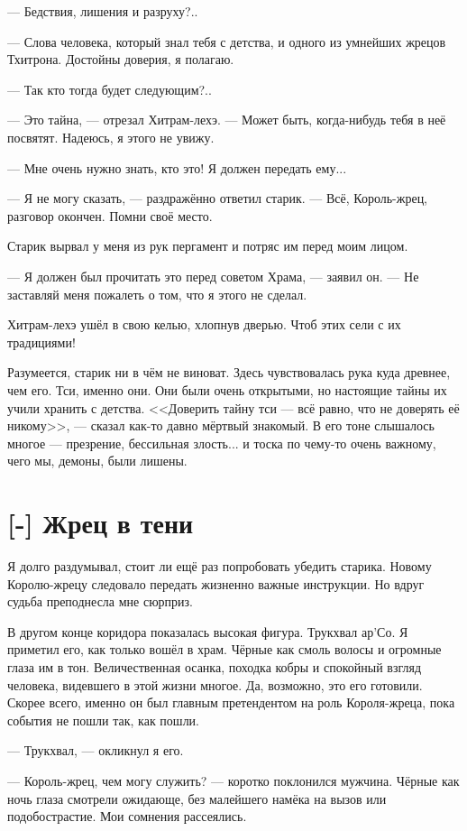 --- Бедствия, лишения и разруху?..

--- Слова человека, который знал тебя с детства, и одного из умнейших жрецов Тхитрона.
Достойны доверия, я полагаю.

--- Так кто тогда будет следующим?..

--- Это тайна, --- отрезал Хитрам-лехэ.
--- Может быть, когда-нибудь тебя в неё посвятят.
Надеюсь, я этого не увижу.

--- Мне очень нужно знать, кто это!
Я должен передать ему...

--- Я не могу сказать, --- раздражённо ответил старик.
--- Всё, Король-жрец, разговор окончен.
Помни своё место.

Старик вырвал у меня из рук пергамент и потряс им перед моим лицом.

--- Я должен был прочитать это перед советом Храма, --- заявил он.
--- Не заставляй меня пожалеть о том, что я этого не сделал.

Хитрам-лехэ ушёл в свою келью, хлопнув дверью.
Чтоб этих сели с их традициями!

Разумеется, старик ни в чём не виноват.
Здесь чувствовалась рука куда древнее, чем его.
Тси, именно они.
Они были очень открытыми, но настоящие тайны их учили хранить с детства.
<<Доверить тайну тси --- всё равно, что не доверять её никому>>, --- сказал как-то давно мёртвый знакомый.
В его тоне слышалось многое --- презрение, бессильная злость... и тоска по чему-то очень важному, чего мы, демоны, были лишены.

\section{[-] Жрец в тени}

Я долго раздумывал, стоит ли ещё раз попробовать убедить старика.
Новому Королю-жрецу следовало передать жизненно важные инструкции.
Но вдруг судьба преподнесла мне сюрприз.

В другом конце коридора показалась высокая фигура.
Трукхвал ар'Со.
Я приметил его, как только вошёл в храм.
Чёрные как смоль волосы и огромные глаза им в тон.
Величественная осанка, походка кобры и спокойный взгляд человека, видевшего в этой жизни многое.
Да, возможно, это его готовили.
Скорее всего, именно он был главным претендентом на роль Короля-жреца, пока события не пошли так, как пошли.

--- Трукхвал, --- окликнул я его.

--- Король-жрец, чем могу служить? --- коротко поклонился мужчина.
Чёрные как ночь глаза смотрели ожидающе, без малейшего намёка на вызов или подобострастие.
Мои сомнения рассеялись.

